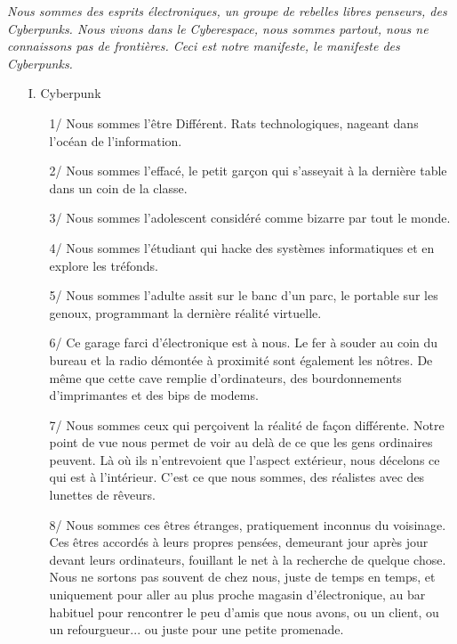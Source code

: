 \documentclass[11pt,twoside,a4paper]{book}
\begin{document}
\emph{\footnotesize Nous sommes des esprits {\'e}lectroniques, un groupe de rebelles libres penseurs, des Cyberpunks. Nous vivons dans le Cyberespace, nous sommes partout, nous ne connaissons pas de fronti{\`e}res. Ceci est notre manifeste, le manifeste des Cyberpunks. } %

\begin{enumerate}
		\setlength{\itemsep}{1pt}
		\setlength{\parskip}{0pt}
		\setlength{\parsep}{0pt}
		
	\item[I.] Cyberpunk
	\begin{enumerate}
		\setlength{\itemsep}{1pt}
		\setlength{\parskip}{0pt}
		\setlength{\parsep}{0pt}
		
		\item[1/] Nous sommes l'{\^e}tre Diff{\'e}rent. Rats technologiques, nageant dans l'oc{\'e}an de l'information.
		\item[2/] Nous sommes l'effac{\'e}, le petit gar\c{c}on qui s'asseyait {\`a} la derni{\`e}re table dans un coin de la classe.
		\item[3/] Nous sommes l'adolescent consid{\'e}r{\'e} comme bizarre par tout le monde.
		\item[4/] Nous sommes l'{\'e}tudiant qui hacke des syst{\`e}mes informatiques et en explore les tr{\'e}fonds.
		\item[5/] Nous sommes l'adulte assit sur le banc d'un parc, le portable sur les genoux, programmant la derni{\`e}re r{\'e}alit{\'e} virtuelle.
		\item[6/] Ce garage farci d'{\'e}lectronique est {\`a} nous. Le fer {\`a} souder au coin du bureau et la radio d{\'e}mont{\'e}e {\`a} proximit{\'e} sont {\'e}galement les n{\^o}tres. De m{\^e}me que cette cave remplie d'ordinateurs, des bourdonnements d'imprimantes et des bips de modems.
		\item[7/] Nous sommes ceux qui per\c{c}oivent la r{\'e}alit{\'e} de fa\c{c}on diff{\'e}rente. Notre point de vue nous permet de voir au del{\`a} de ce que les gens ordinaires peuvent. L{\`a} o{\`u} ils n'entrevoient que l'aspect ext{\'e}rieur, nous d{\'e}celons ce qui est {\`a} l'int{\'e}rieur. C'est ce que nous sommes, des r{\'e}alistes avec des lunettes de r{\^e}veurs.
		\item[8/] Nous sommes ces {\^e}tres {\'e}tranges, pratiquement inconnus du voisinage. Ces {\^e}tres accord{\'e}s {\`a} leurs propres pens{\'e}es, demeurant jour apr{\`e}s jour devant leurs ordinateurs, fouillant le net {\`a} la recherche de quelque chose. Nous ne sortons pas souvent de chez nous, juste de temps en temps, et uniquement pour aller au plus proche magasin d'{\'e}lectronique, au bar habituel pour rencontrer le peu d'amis que nous avons, ou un client, ou un refourgueur... ou juste pour une petite promenade.

\end{enumerate}
\end{enumerate}
\end{document}
